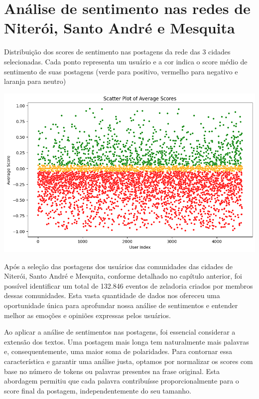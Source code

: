 \section{Análise de sentimento nas redes de Niterói, Santo André e Mesquita}

\begin{quadro}[!htb]
	\caption{Distribuição dos scores de sentimento nas postagens da rede das 3 cidades selecionadas. Cada ponto representa um usuário e a cor indica o score médio de sentimento de suas postagens (verde para positivo, vermelho para negativo e laranja para neutro)}
	\label{fig:scores_scatterplot}
	\centering
	\includegraphics[scale=0.70]{images/scores_scatterplot.png}
	\fautor
\end{quadro}

Após a seleção das postagens dos usuários das comunidades das cidades de Niterói, Santo André e Mesquita, conforme detalhado no capítulo anterior, foi possível identificar um total de 132.846 eventos de zeladoria criados por membros dessas comunidades. Esta vasta quantidade de dados nos ofereceu uma oportunidade única para aprofundar nossa análise de sentimentos e entender melhor as emoções e opiniões expressas pelos usuários.

Ao aplicar a análise de sentimentos nas postagens, foi essencial considerar a extensão dos textos. Uma postagem mais longa tem naturalmente mais palavras e, consequentemente, uma maior soma de polaridades. Para contornar essa característica e garantir uma análise justa, optamos por normalizar os scores com base no número de tokens ou palavras presentes na frase original. Esta abordagem permitiu que cada palavra contribuísse proporcionalmente para o score final da postagem, independentemente do seu tamanho.

